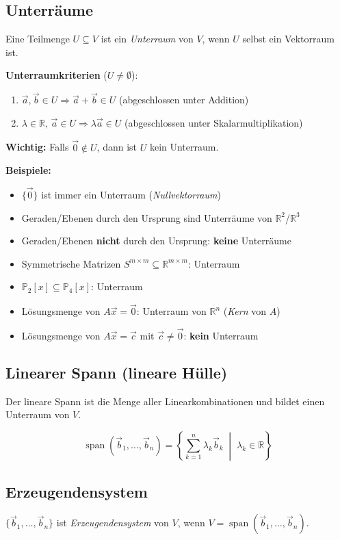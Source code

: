 \subsection{Unterräume}
Eine Teilmenge $U \subseteq V$ ist ein \emph{Unterraum} von $V$, wenn $U$ selbst ein Vektorraum ist.

\textbf{Unterraumkriterien} ($U \neq \emptyset$):
\begin{enumerate}
    \item $\vec{a}, \vec{b} \in U \Rightarrow \vec{a} + \vec{b} \in U$ \quad (abgeschlossen unter Addition)
    \item $\lambda \in \mathbb{R},\, \vec{a} \in U \Rightarrow \lambda\vec{a} \in U$ \quad (abgeschlossen unter Skalarmultiplikation)
\end{enumerate}

\textbf{Wichtig:} Falls $\vec{0} \notin U$, dann ist $U$ kein Unterraum.

\textbf{Beispiele:}
\begin{itemize}
    \item $\{\vec{0}\}$ ist immer ein Unterraum (\emph{Nullvektorraum})
    \item Geraden/Ebenen durch den Ursprung sind Unterräume von $\mathbb{R}^2$/$\mathbb{R}^3$
    \item Geraden/Ebenen \textbf{nicht} durch den Ursprung: \textbf{keine} Unterräume
    \item Symmetrische Matrizen $S^{m \times m} \subseteq \mathbb{R}^{m \times m}$: Unterraum
    \item $\mathbb{P}_2[x] \subseteq \mathbb{P}_4[x]$: Unterraum
    \item Lösungsmenge von $A\vec{x} = \vec{0}$: Unterraum von $\mathbb{R}^n$ (\emph{Kern} von $A$)
    \item Lösungsmenge von $A\vec{x} = \vec{c}$ mit $\vec{c} \neq \vec{0}$: \textbf{kein} Unterraum
\end{itemize}

\subsection{Linearer Spann (lineare Hülle)}
Der lineare Spann ist die Menge aller Linearkombinationen und bildet einen Unterraum von $V$.

\[
    \operatorname{span}(\vec{b}_1, \ldots, \vec{b}_n) = \left\{ \sum_{k=1}^{n} \lambda_k \vec{b}_k \;\middle|\; \lambda_k \in \mathbb{R} \right\}
\]

\subsection{Erzeugendensystem}
$\{\vec{b}_1, \ldots, \vec{b}_n\}$ ist \emph{Erzeugendensystem} von $V$, wenn $V = \operatorname{span}(\vec{b}_1, \ldots, \vec{b}_n)$.

